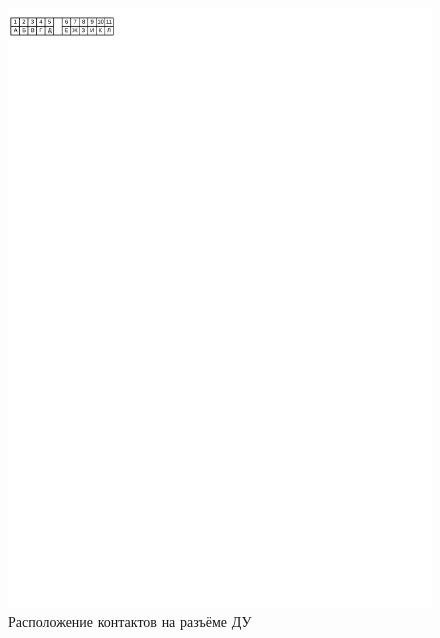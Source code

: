 \documentclass[12pt, a4paper]{article}
\begin{document}
\begin{figure}
\begin{center}
\includegraphics[width=\textwidth, clip, viewport=0 800 360 830]{rc-jack}
\end{center}
\caption{Расположение контактов на разъёме ДУ}
\label{pic-rc-jack}
\end{figure}
\end{document}
